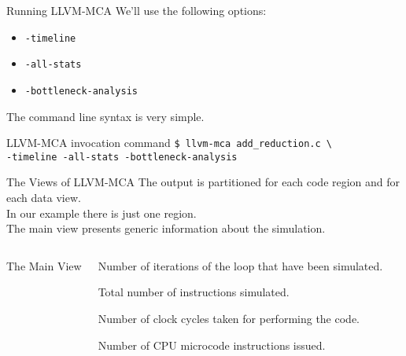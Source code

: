 \begin{frame}{Running LLVM-MCA}
We'll use the following options:
\begin{itemize}
\item \texttt{-timeline}
\item \texttt{-all-stats}
\item \texttt{-bottleneck-analysis}
\end{itemize}
\medskip
The command line syntax is very simple.
\begin{block}{LLVM-MCA invocation command}
\tt \$ llvm-mca add\_reduction.c \textbackslash \\
\hphantom{MMMM}-timeline -all-stats -bottleneck-analysis
\end{block}
\end{frame}


\begin{frame}{The Views of LLVM-MCA}
The output is partitioned for each \alert{code region} and for each \alert{data view}.\\
\smallskip
In our example there is just one region.\\
\medskip
The main view presents generic information about the simulation.
%
\begin{columns}[onlytextwidth]
%
\begin{block}{The Main View}
\end{block}
%
\begin{description}[ABC]
\item[\texttt{Iterations}:] Number of iterations of the loop that have been simulated.
\item[\texttt{Instructions}:] Total number of instructions simulated.
\item[\texttt{Total Cycles}:] Number of clock cycles taken for performing the code.
\item[\texttt{Total uOps}:] Number of CPU microcode instructions issued.
\end{description}
%
\end{columns}
%
\end{frame}


